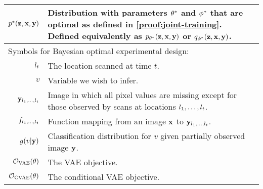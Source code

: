 \begin{table*}
\begin{tabular}{rp{9cm}}
    ${p}^*{}({\mathbf{z}}, {\mathbf{x}}, {\mathbf{y}})$           & Distribution with parameters ${\theta}^*$ and ${\phi}^*$ that are optimal as defined in \cref{proof:joint-training}. Defined equivalently as $p_{{\theta}^*}({\mathbf{z}}, {\mathbf{x}}, {\mathbf{y}})$ or $q_{{\phi}^*}({\mathbf{z}},{\mathbf{x}},{\mathbf{y}})$.  \\
    \midrule
    \multicolumn{2}{l}{Symbols for Bayesian optimal experimental design:} \\
    $l{}_t$                                 & The location scanned at time $t$. \\
    $v$                                   & Variable we wish to infer. \\
    ${\mathbf{y}}_{l{}_1,\ldots,l{}_t}$             & Image in which all pixel values are missing except for those observed by scans at locations $l{}_1,\ldots,l{}_t$. \\
    $f_{l{}_1,\ldots,l{}_t}$                    & Function mapping from an image ${\mathbf{x}}$ to ${\mathbf{y}}_{l{}_1,\ldots,l{}_t}$. \\
    $g(v|{\mathbf{y}})$                       & Classification distribution for $v$ given partially observed image ${\mathbf{y}}$. \\
    ${\mathcal{O}}_\text{VAE}(\theta)$                      & The VAE objective. \\   
    ${\mathcal{O}}_\text{CVAE}(\theta)$                      & The conditional VAE objective. \\   
    \bottomrule
  \end{tabular}
  \vspace{-1em}
\end{table*}
